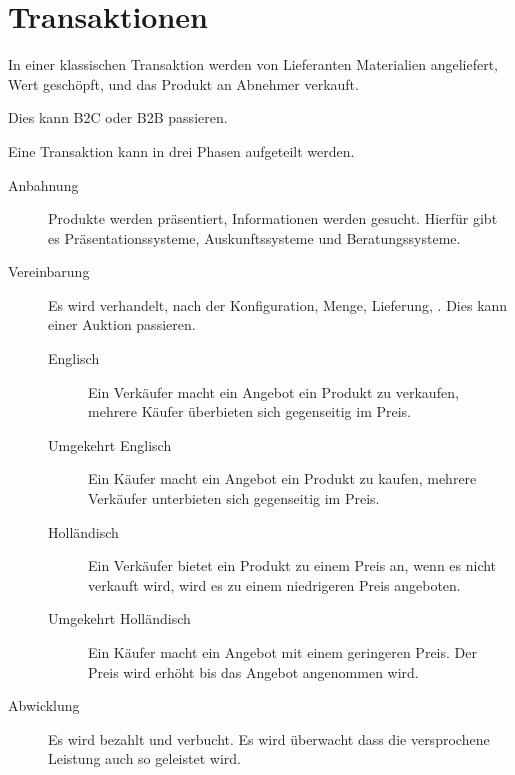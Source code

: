 \documentclass{article}
\begin{document}
\section{Transaktionen} 
In einer klassischen Transaktion werden von Lieferanten Materialien angeliefert, Wert geschöpft, und das Produkt an Abnehmer verkauft.

Dies kann B2C oder B2B passieren.

Eine Transaktion kann in drei Phasen aufgeteilt werden.
\begin{description}
 \item[Anbahnung] Produkte werden präsentiert, Informationen werden gesucht. Hierfür gibt es Präsentationssysteme, Auskunftssysteme und Beratungssysteme.
 \item[Vereinbarung] Es wird verhandelt, nach der Konfiguration, Menge, Lieferung, \etc. Dies kann einer Auktion passieren.
 \begin{description}
  \item[Englisch] Ein Verkäufer macht ein Angebot ein Produkt zu verkaufen, mehrere Käufer überbieten sich gegenseitig im Preis.
  \item[Umgekehrt Englisch] Ein Käufer macht ein Angebot ein Produkt zu kaufen, mehrere Verkäufer unterbieten sich gegenseitig im Preis.
  \item[Holländisch] Ein Verkäufer bietet ein Produkt zu einem Preis an, wenn es nicht verkauft wird, wird es zu einem niedrigeren Preis angeboten.
  \item[Umgekehrt Holländisch] Ein Käufer macht ein Angebot mit einem geringeren Preis. Der Preis wird erhöht bis das Angebot angenommen wird. 
 \end{description}
 \item[Abwicklung] Es wird bezahlt und verbucht. Es wird überwacht dass die versprochene Leistung auch so geleistet wird.
\end{description}
\end{document}
